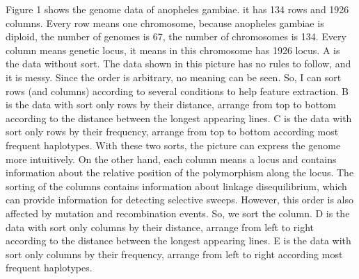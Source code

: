 \documentclass[11pt,a4 paper,title page]{article}
\begin{document}
\hfill\break
Figure 1 shows the genome data of anopheles gambiae. it has 134 rows and 1926 columns.  Every row means one chromosome, because anopheles gambiae is diploid, the number of genomes is 67, the number of chromosomes is 134. Every column means genetic locus, it means in this chromosome has 1926 locus. A is the data without sort. The data shown in this picture has no rules to follow, and it is messy. Since the order is arbitrary, no meaning can be seen. So, I can sort rows (and columns) according to several conditions to help feature extraction. B is the data with sort only rows by their distance, arrange from top to bottom according to the distance between the longest appearing lines. C is the data with sort only rows by their frequency, arrange from top to bottom according most frequent haplotypes. With these two sorts, the picture can express the genome more intuitively. On the other hand, each column means a locus and contains information about the relative position of the polymorphism along the locus. The sorting of the columns contains information about linkage disequilibrium, which can provide information for detecting selective sweeps. However, this order is also affected by mutation and recombination events. So, we sort the column. D is the data with sort only columns by their distance, arrange from left to right according to the distance between the longest appearing lines. E is the data with sort only columns by their frequency, arrange from left to right according most frequent haplotypes.
\end{document}
